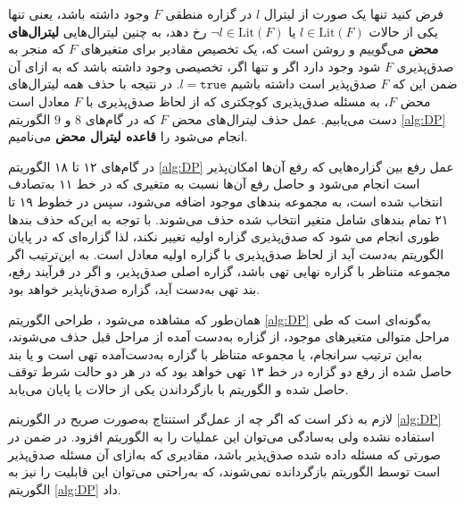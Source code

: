فرض کنید تنها یک صورت از لیترال 
$l$
در گزاره منطقی 
$F$
وجود داشته باشد، یعنی  تنها یکی از حالات 
$l\in \mathrm{Lit}(F)$
 یا 
$\neg l\in \mathrm{Lit}(F)$
رخ دهد، به چنین لیترال‌هایی 
\textbf{لیترال‌های محض} 
می‌گوییم و  روشن است که، یک  تخصیص  مقادیر  برای متغیرهای 
$F$
که منجر به صدق‌پذیری
$F$
شود وجود دارد اگر و تنها اگر، تخصیصی وجود داشته باشد که به ازای  آن ضمن این که 
$F$
صدق‌پذیر است داشته باشیم
$l = \texttt{true}$.
در نتیجه با حذف همه لیترال‌های محض 
$F$، 
به  مسئله صدق‌پذیری  کوچکتری که از لحاظ صدق‌پذیری با 
$F$
معادل است دست می‌یابیم. عمل حذف لیترال‌های محض 
$F$
که در گام‌های 
$8$
و 
$9$
الگوریتم 
\ref{alg:DP}
انجام می‌شود را 
\textbf{قاعده لیترال‌  محض}
می‌نامیم. 

در گام‌های ۱۲ تا ۱۸ الگوریتم 
\ref{alg:DP}
عمل رفع بین گزاره‌هایی که رفع آن‌ها امکان‌پذیر است انجام می‌شود و حاصل رفع آن‌ها نسبت به متغیری که در خط ۱۱ به‌تصادف انتخاب شده است، به مجموعه بندهای موجود اضافه می‌شود، سپس در خطوط ۱۹ تا ۲۱ تمام بندهای شامل متغیر انتخاب شده حذف می‌شوند.  با توجه به این‌که حذف بندها طوری انجام می شود که صدق‌پذیری گزاره اولیه تغییر نکند، لذا گزاره‌ای که در پایان الگوریتم به‌دست آید از لحاظ صدق‌پذیری با گزاره اولیه معادل است. به این‌ترتیب اگر مجموعه متناظر با گزاره نهایی تهی باشد، گزاره اصلی صدق‌پذیر،  و اگر در فرآیند رفع، بند تهی به‌دست آید، گزاره  صدق‌ناپذیر خواهد بود. 

همان‌طور که مشاهده می‌شود ، طراحی الگوریتم 
\ref{alg:DP}
به‌گونه‌ای است که طی مراحل متوالی متغیرهای موجود، از گزاره به‌دست آمده از مراحل قبل حذف می‌شوند، به‌این ترتیب  سرانجام، یا مجموعه متناظر با گزاره به‌دست‌آمده تهی است و  یا بند حاصل شده از رفع دو گزاره  در خط  ۱۳ تهی خواهد بود که در هر دو حالت شرط توقف حاصل شده و الگوریتم با بازگرداندن یکی از حالات 
یا 
پایان می‌یابد. 

لازم به ذکر است که اگر چه از عمل‌گر استنتاج به‌صورت صریح در الگوریتم 
\ref{alg:DP}
 استفاده نشده  ولی به‌سادگی می‌توان این عملیات را به الگوریتم افزود. در ضمن در صورتی که مسئله داده شده صدق‌پذیر باشد، مقادیری که به‌ازای آن مسئله صدق‌پذیر است توسط الگوریتم بازگردانده نمی‌شوند، که  به‌راحتی  می‌توان این قابلیت را نیز به الگوریتم 
 \ref{alg:DP}
 داد. 
